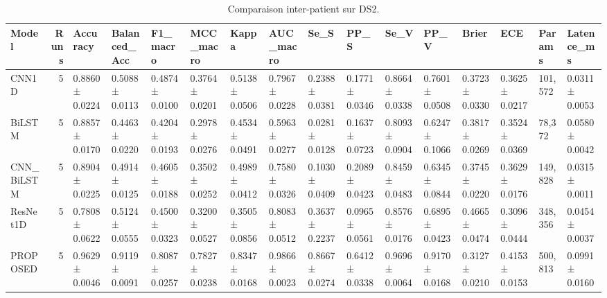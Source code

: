 \begin{table}
\caption{Comparaison inter-patient sur DS2.}
\label{tab:comparison}
\begin{tabular}{lrllllllllllllll}
\toprule
Model & Runs & Accuracy & Balanced_Acc & F1_macro & MCC_macro & Kappa & AUC_macro & Se_S & PP_S & Se_V & PP_V & Brier & ECE & Params & Latence_ms \\
\midrule
CNN1D & 5 & 0.8860 ± 0.0224 & 0.5088 ± 0.0113 & 0.4874 ± 0.0100 & 0.3764 ± 0.0201 & 0.5138 ± 0.0506 & 0.7967 ± 0.0228 & 0.2388 ± 0.0381 & 0.1771 ± 0.0346 & 0.8664 ± 0.0338 & 0.7601 ± 0.0508 & 0.3723 ± 0.0330 & 0.3625 ± 0.0217 & 101,572 & 0.0311 ± 0.0053 \\
BiLSTM & 5 & 0.8857 ± 0.0170 & 0.4463 ± 0.0220 & 0.4204 ± 0.0193 & 0.2978 ± 0.0276 & 0.4534 ± 0.0491 & 0.5963 ± 0.0277 & 0.0281 ± 0.0128 & 0.1637 ± 0.0723 & 0.8093 ± 0.0904 & 0.6247 ± 0.1066 & 0.3817 ± 0.0269 & 0.3524 ± 0.0369 & 78,372 & 0.0580 ± 0.0042 \\
CNN_BiLSTM & 5 & 0.8904 ± 0.0225 & 0.4914 ± 0.0125 & 0.4605 ± 0.0188 & 0.3502 ± 0.0252 & 0.4989 ± 0.0412 & 0.7580 ± 0.0326 & 0.1030 ± 0.0409 & 0.2089 ± 0.0423 & 0.8459 ± 0.0483 & 0.6345 ± 0.0844 & 0.3745 ± 0.0220 & 0.3629 ± 0.0176 & 149,828 & 0.0315 ± 0.0011 \\
ResNet1D & 5 & 0.7808 ± 0.0622 & 0.5124 ± 0.0555 & 0.4500 ± 0.0323 & 0.3200 ± 0.0527 & 0.3505 ± 0.0856 & 0.8083 ± 0.0512 & 0.3637 ± 0.2237 & 0.0965 ± 0.0561 & 0.8576 ± 0.0176 & 0.6895 ± 0.0423 & 0.4665 ± 0.0474 & 0.3096 ± 0.0444 & 348,356 & 0.0454 ± 0.0037 \\
PROPOSED & 5 & 0.9629 ± 0.0046 & 0.9119 ± 0.0091 & 0.8087 ± 0.0257 & 0.7827 ± 0.0238 & 0.8347 ± 0.0168 & 0.9866 ± 0.0023 & 0.8667 ± 0.0274 & 0.6412 ± 0.0338 & 0.9696 ± 0.0064 & 0.9170 ± 0.0168 & 0.3127 ± 0.0210 & 0.4153 ± 0.0153 & 500,813 & 0.0991 ± 0.0160 \\
\bottomrule
\end{tabular}
\end{table}
